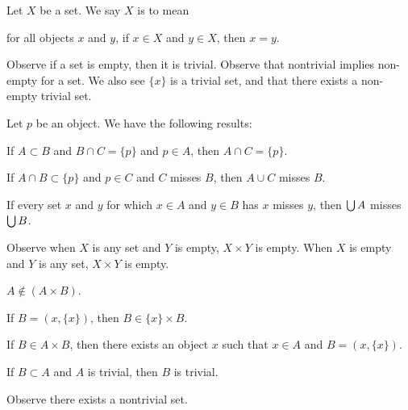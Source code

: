 \documentclass{article}
\begin{document}
\begin{definition}\label{zfmisc1:defn10:trivial}
Let $X$ be a set. We say $X$ is  to mean
\begin{defn}
\item for all objects $x$ and $y$, if $x\in X$ and $y\in X$, then $x=y$.
\end{defn}
\end{definition}

Observe if a set is empty, then it is trivial. Observe that nontrivial
implies non-empty for a set. We also see $\{x\}$ is a trivial set, and
that there exists a non-empty trivial set.

Let $p$ be an object. We have the following results:
\begin{thm}
\item\label{zfmisc1:124} If $A\subset B$ and $B\cap C=\{p\}$ and $p\in A$,
  then $A\cap C=\{p\}$.
\item\label{zfmisc1:125} If $A\cap B\subset\{p\}$ and $p\in C$ and $C$
  misses $B$, then $A\cup C$ misses $B$.
\item\label{zfmisc1:126} If every set $x$ and $y$ for which $x\in A$ and
  $y\in B$ has $x$ misses $y$, then $\bigcup A$ misses $\bigcup B$. 
\end{thm}

Observe when $X$ is any set and $Y$ is empty, $X\times Y$ is empty.
When $X$ is empty and $Y$ is any set, $X\times Y$ is empty.

\begin{thm}
\item\label{zfmisc1:127} $A\notin(A\times B)$.
\item\label{zfmisc1:128} If $B=(x,\{x\})$, then $B\in\{x\}\times B$.
\item\label{zfmisc1:129} If $B\in A\times B$, then there exists an object $x$
  such that $x\in A$ and $B=(x,\{x\})$.
\item\label{zfmisc1:130} If $B\subset A$ and $A$ is trivial, then $B$ is trivial.
\end{thm}

Observe there exists a nontrivial set.
\end{document}
